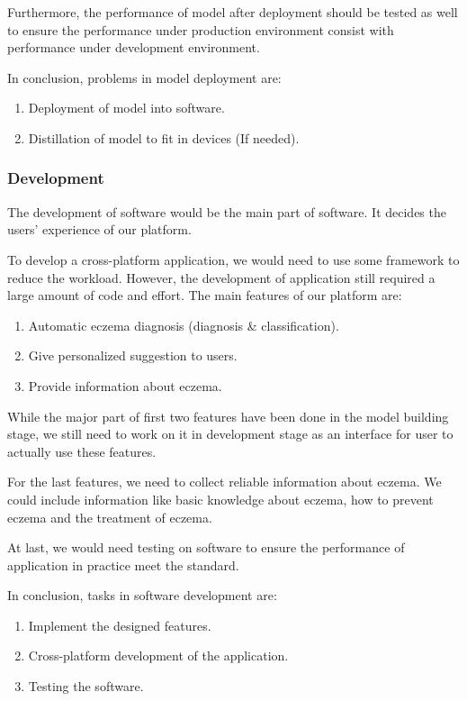             Furthermore, the performance of model after deployment should be tested as well to ensure the performance under production environment consist with performance under development environment. 

            In conclusion, problems in model deployment are:
            \begin{enumerate}
                \item Deployment of model into software.
                \item Distillation of model to fit in devices (If needed).
            \end{enumerate}
        \subsubsection{Development}
            The development of software would be the main part of software. It decides the users' experience of our platform.
            
            To develop a cross-platform application, we would need to use some framework to reduce the workload. However, the development of application still required a large amount of code and effort. The main features of our platform are:
            \begin{enumerate}
                \item Automatic eczema diagnosis (diagnosis \& classification).
                \item Give personalized suggestion to users.
                \item Provide information about eczema.
            \end{enumerate}
            While the major part of first two features have been done in the model building stage, we still need to work on it in development stage as an interface for user to actually use these features.

            For the last features, we need to collect reliable information about eczema. We could include information like basic knowledge about eczema, how to prevent eczema and the treatment of eczema.

            At last, we would need testing on software to ensure the performance of application in practice meet the standard.

            In conclusion, tasks in software development are:
            \begin{enumerate}
                \item Implement the designed features.
                \item Cross-platform development of the application.
                \item Testing the software.
            \end{enumerate}
